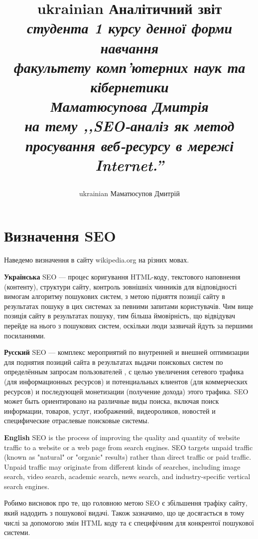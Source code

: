 \documentclass[a4paper,12pt, titlepage]{article}
\title{\begin{otherlanguage*}{ukrainian}
           \textbf{Аналітичний звіт \\}
           \textit{
               студента 1 курсу денної форми навчання \\
               факультету комп'ютерних наук та кібернетики \\
               Маматюсупова Дмитрія\\
               на тему ,,SEO-аналіз як метод просування веб-ресурсу в мережі Internet.''}
\end{otherlanguage*}}
\author{\begin{otherlanguage*}{ukrainian} Маматюсупов Дмитрій \end{otherlanguage*}}
\date{\begin{otherlanguage*}{ukrainian} Квітень 2021 \end{otherlanguage*}}
\begin{document}
    \maketitle

    \tableofcontents

    \newpage
    \section{Визначення SEO}
    Наведемо визначення в сайту wikipedia.org на різних мовах. \cite{seo_wiki}
    \begin{multicols}{3}
        \textbf{Українська}
        SEO — процес коригування HTML-коду,
        текстового наповнення (контенту), структури сайту, контроль зовнішніх чинників для відповідності
        вимогам алгоритму пошукових систем, з метою підняття позиції сайту в результатах пошуку
        в цих системах за певними запитами користувачів. Чим вище позиція сайту в результатах пошуку,
        тим більша ймовірність, що відвідувач перейде на нього з пошукових систем,
        оскільки люди зазвичай йдуть за першими посиланнями.


        \columnbreak
        \textbf{Русский}
        SEO — комплекс мероприятий по внутренней и внешней
        оптимизации для поднятия позиций сайта в результатах выдачи поисковых систем по определённым запросам пользователей
        , с целью увеличения сетевого трафика (для информационных ресурсов) и потенциальных клиентов
        (для коммерческих ресурсов) и последующей монетизации (получение дохода) этого трафика.
        SEO может быть ориентировано на различные виды поиска, включая поиск информации, товаров, услуг,
        изображений, видеороликов, новостей и специфические отраслевые поисковые системы.

        \columnbreak
        \textbf{English}
        SEO is the process of improving the quality and quantity of website traffic to a
        website or a web page from search engines.
        SEO targets unpaid traffic (known as "natural" or "organic" results) rather than direct traffic or paid traffic.
        Unpaid traffic may originate from different kinds of searches, including image search, video search, academic search,
        news search, and industry-specific vertical search engines.
    \end{multicols}

    Робимо висновок про те, що головною метою SEO є збільшення трафіку сайту, який надодить з пошукової видачі.
    Також зазначимо, що це досягається в тому числі за допомогою змін HTML коду та є специфічним для конкрентої
    пошукової системи.
\end{document}
